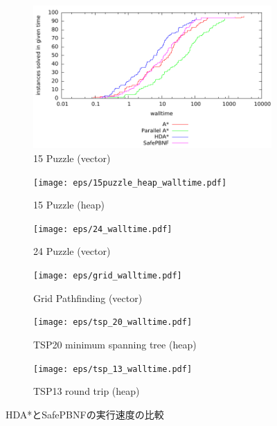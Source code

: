 \documentclass[uplatex]{jsarticle}
\begin{document}
\begin{figure}
	\centering
	\begin{subfigure}{0.4\columnwidth}
		\includegraphics[width=\columnwidth,draft]{eps/15puzzle_vector_walltime.pdf}
		\caption{15 Puzzle (vector)}
		\label{fig:15puzzle_vector}
	\end{subfigure}
	\begin{subfigure}{0.4\columnwidth}
		\texttt{[image: eps/15puzzle\_heap\_walltime.pdf]}
		\caption{15 Puzzle (heap)}
		\label{fig:15puzzle_heap}
	\end{subfigure}
	\begin{subfigure}{0.4\columnwidth}
		\texttt{[image: eps/24\_walltime.pdf]}
		\caption{24 Puzzle (vector)}
		\label{fig:24puzzle_vector}
	\end{subfigure}
	\begin{subfigure}{0.4\columnwidth}
		\texttt{[image: eps/grid\_walltime.pdf]}
		\caption{Grid Pathfinding (vector)}
		\label{fig:grid}
	\end{subfigure}
	\begin{subfigure}{0.4\columnwidth}
		\texttt{[image: eps/tsp\_20\_walltime.pdf]}
		\caption{TSP20 minimum spanning tree (heap)}
		\label{fig:tsp_20_mst}
	\end{subfigure}
	\begin{subfigure}{0.4\columnwidth}
		\texttt{[image: eps/tsp\_13\_walltime.pdf]}
		\caption{TSP13 round trip (heap)}
		\label{fig:tsp_13}
	\end{subfigure}

	\caption{HDA*とSafePBNFの実行速度の比較}
	\label{fig:comparison}
\end{figure}%
\end{document}
